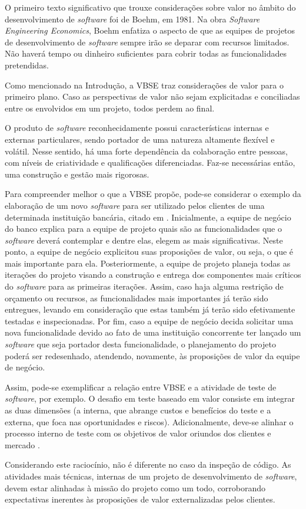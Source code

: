 O primeiro texto significativo que trouxe considerações sobre valor no âmbito do desenvolvimento de \textit{software} foi de Boehm, em 1981. Na obra \textit{Software Engineering Economics}, Boehm enfatiza o aspecto de que as equipes de projetos de desenvolvimento de \textit{software} sempre irão se deparar com recursos limitados. Não haverá tempo ou dinheiro suficientes para cobrir todas as funcionalidades pretendidas.

Como mencionado na Introdução, a VBSE traz considerações de valor para o primeiro plano. Caso as perspectivas de valor não sejam explicitadas e conciliadas entre os envolvidos em um projeto, todos perdem ao final.

O produto de \textit{software} reconhecidamente possui características internas e externas particulares, sendo portador de uma natureza altamente flexível e volátil. Nesse sentido, há uma forte dependência da colaboração entre pessoas, com níveis de criatividade e qualificações diferenciadas. Faz-se necessárias então, uma construção e gestão mais rigorosas.

Para compreender melhor o que a VBSE propõe, pode-se considerar o exemplo da elaboração de um novo \textit{software} para ser utilizado pelos clientes de uma determinada instituição bancária, citado em \cite{vbse1}. Inicialmente, a equipe de negócio do banco explica para a equipe de projeto quais são as funcionalidades que o \textit{software} deverá contemplar e dentre elas, elegem as mais significativas. Neste ponto, a equipe de negócio explicitou suas proposições de valor, ou seja, o que é mais importante para ela. Posteriormente, a equipe de projeto planeja todas as iterações do projeto visando a construção e entrega dos componentes mais críticos do \textit{software} para as primeiras iterações. Assim, caso haja alguma restrição de orçamento ou recursos, as funcionalidades mais importantes já terão sido entregues, levando em consideração que estas também já terão sido efetivamente testadas e inspecionadas. Por fim, caso a equipe de negócio decida solicitar uma nova funcionalidade devido ao fato de uma instituição concorrente ter lançado um \textit{software} que seja portador desta funcionalidade, o planejamento do projeto poderá ser redesenhado, atendendo, novamente, às proposições de valor da equipe de negócio.

Assim, pode-se exemplificar a relação entre VBSE e a atividade de teste de \textit{software}, por exemplo. O desafio em teste baseado em valor consiste em integrar as duas dimensões (a interna, que abrange custos e benefícios do teste e a externa, que foca nas oportunidades e riscos). Adicionalmente, deve-se  alinhar o processo interno de teste com os objetivos de valor oriundos dos clientes e mercado \cite{vbse1}.

Considerando este raciocínio, não é diferente no caso da inspeção de código. As atividades mais técnicas, internas de um projeto de desenvolvimento de \textit{software}, devem estar alinhadas à missão do projeto como um todo, corroborando expectativas inerentes às proposições de valor externalizadas pelos clientes.